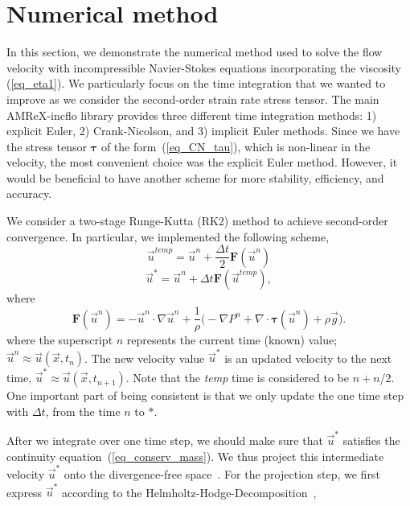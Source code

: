 \section{Numerical method}
In this section, we demonstrate the numerical method used to solve the flow velocity with incompressible Navier-Stokes equations incorporating the viscosity (\ref{eq_eta1}). We particularly focus on the time integration that we wanted to improve as we consider the second-order strain rate stress tensor.
The main AMReX-incflo library provides three different time integration methods: 1) explicit Euler, 2) Crank-Nicolson, and 3) implicit Euler methods. 
Since we have the stress tensor ${\bm \tau}$ of the form~(\ref{eq_CN_tau}), which is non-linear in the velocity, the most convenient choice was the explicit Euler method.
 However, it would be beneficial to have another scheme for more stability, efficiency, and accuracy. 
 \par
 We consider a two-stage Runge-Kutta (RK2) method to achieve second-order convergence. 
In particular, we implemented the following scheme,
\begin{equation}
	\vec{u}^{temp} = \vec{u}^{n} + \frac{\Delta t}{2} {\bm F} \left( \vec{u}^{n} \right)
	\label{eq_RK2_s1} 
\end{equation}
\begin{equation}
	\vec{u}^{*} = \vec{u}^{n} + \Delta t {\bm F} \left( \vec{u}^{temp} \right),
	\label{eq_RK2_s2}
\end{equation}
where 
\[
  {\bm F} \left( \vec{u}^{n} \right)= 
    -\vec{u}^n \cdot \nabla \vec{u}^n 
    +\frac{1}{\rho}
    \biggl(
    - \nabla P^n 
        + \nabla \cdot   \bm{\tau}(\vec{u}^n)
        +  \rho  \vec{g} 
        \biggr).
\]
where the superscript $n$ represents the current time (known) value; $\vec{u}^n \approx \vec{u}(\vec{x}, t_n)$. The new velocity value $\vec{u}^*$ is an updated velocity to the next time, $\vec{u}^*  \approx \vec{u} (\vec{x}, t_{n+1})$. 
Note that the \textit{temp} time is considered to be $ n + n$/2. One important part of being consistent is that we only update the one time step with $\Delta t$, from the time $n$ to $*$. 
\par
After we integrate over one time step, we should make sure that $\vec{u}^*$ satisfies the continuity equation~(\ref{eq_conserv_mass}). We thus project this intermediate velocity $\vec{u}^*$ onto the divergence-free space~\cite{sverdrup_highly_2018}.
For the projection step, we first express $\vec{u}^{*}$ according to the Helmholtz-Hodge-Decomposition~\cite{chorin_mathematical_1993}, 
